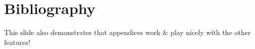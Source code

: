 \documentclass[10pt]{beamer}
\begin{document}
\appendix
{}
\section{Bibliography}

\begin{frame}

    \nocite{*}
    \printbibliography[heading=none]
    
    This slide also demonstrates that appendices work \& play nicely with the other features!
\end{frame}

\begin{frame}
\juLogoW[height=2.5cm]
\end{frame}
\end{document}
